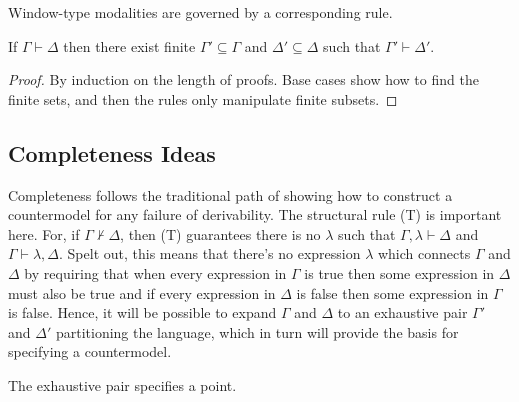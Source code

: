 \documentclass[10pt]{article}
\begin{document}
Window-type modalities are governed by a corresponding rule.



\begin{proposition}[Finiteness]
  If \(\Gamma \vdash \Delta\) then there exist finite \(\Gamma' \subseteq \Gamma\) and \(\Delta' \subseteq \Delta\) such that \(\Gamma' \vdash \Delta'\).
  \begin{proof}
    By induction on the length of proofs.
    Base cases show how to find the finite sets, and then the rules only manipulate finite subsets.
  \end{proof}
\end{proposition}


\subsection{Completeness Ideas}
\label{sec:completeness-ideas}

Completeness follows the traditional path of showing how to construct a countermodel for any failure of derivability.
The structural rule (T) is important here.
For, if \(\Gamma \nvdash \Delta\), then (T) guarantees there is no \(\lambda\) such that \(\Gamma,\lambda \vdash \Delta\) and \(\Gamma \vdash \lambda,\Delta\).
Spelt out, this means that there's no expression \(\lambda\) which connects \(\Gamma\) and \(\Delta\) by requiring that when every expression in \(\Gamma\) is true then some expression in \(\Delta\) must also be true and if every expression in \(\Delta\) is false then some expression in \(\Gamma\) is false.
Hence, it will be possible to expand \(\Gamma\) and \(\Delta\) to an exhaustive pair \(\Gamma'\) and \(\Delta'\) partitioning the language, which in turn will provide the basis for specifying a countermodel.



The exhaustive pair specifies a point.
\end{document}

